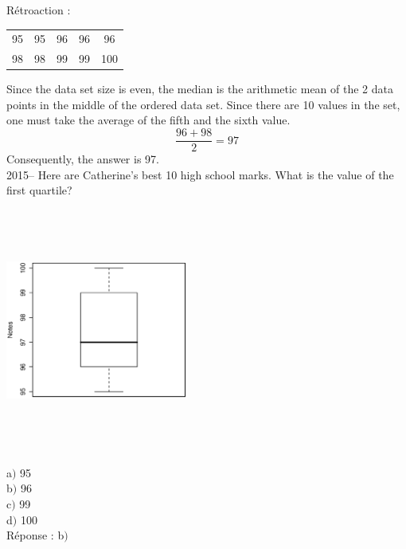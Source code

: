 \documentclass[letterpaper, 12pt]{article}
\begin{document}
R\'etroaction :\\
\begin{center}
 \begin{tabular}{|c  c  c  c  c|} \hline

95 & 95 & 96 & 96 & 96 \\
98 & 98 & 99 & 99 & 100 \\ \hline

\end{tabular}
\end{center}
Since the data set size is even, the median is the arithmetic mean of the 2 data points in the middle of the ordered data set. Since there are 10 values in the set, one must take the average of the fifth and the sixth value.\\
\begin{equation*}
 \frac{96+98}{2}=97
\end{equation*}
Consequently, the answer is 97.\\

2015-- Here are Catherine's best 10 high school marks. What is the value of the first quartile?
\begin{center}
 \includegraphics[width=6cm,height=8cm,angle=-90]{Q2015.eps}
\end{center}


a$)$ 95\\
b$)$ 96\\
c$)$ 99\\
d$)$ 100\\

R\'eponse : b$)$\\
\end{document}
